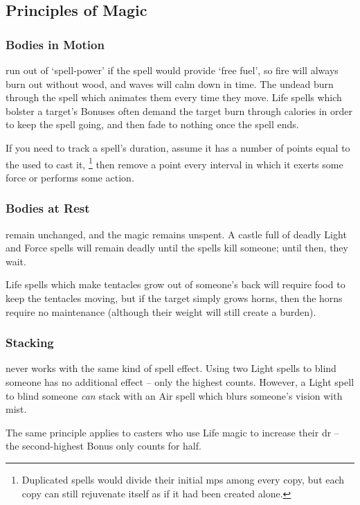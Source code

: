 \begin{multicols}{2}
\subsection{Principles of Magic}

\subsubsection{Bodies in Motion}
run out of `spell-power' if the spell would provide `free fuel', so fire will always burn out without wood, and waves will calm down in time.
The undead burn through the spell which animates them every time they move.
Life spells which bolster a target's Bonuses often demand the target burn through calories in order to keep the spell going, and then fade to nothing once the spell ends.

If you need to track a spell's duration, assume it has a number of points equal to the  used to cast it,%
\footnote{Duplicated spells would divide their initial \glspl{mp} among every copy, but each copy can still rejuvenate itself as if it had been created alone.}
then remove a point every \gls{interval} in which it exerts some force or performs some action.

\subsubsection{Bodies at Rest}
remain unchanged, and the magic remains unspent.
A castle full of deadly Light and Force \glspl{spell} will remain deadly until the \glspl{spell} kill someone; until then, they wait.

Life spells which make tentacles grow out of someone's back will require food to keep the tentacles moving, but if the target simply grows horns, then the horns require no maintenance (although their \gls{weight} will still create a burden).

\subsubsection{Stacking }
never works with the same kind of spell effect.
Using two Light \glspl{spell} to blind someone has no additional effect -- only the highest counts.
However, a Light spell to blind someone \textit{can} stack with an Air \gls{spell} which blurs someone's vision with mist.

The same principle applies to casters who use Life magic to increase their \gls{dr} -- the second-highest Bonus only counts for half.


\end{multicols}
